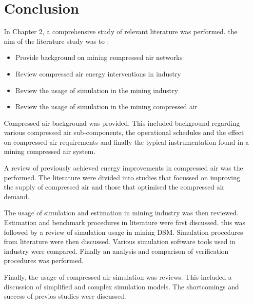 \section{Conclusion}
In Chapter 2, a comprehensive study of relevant literature was performed. the aim of the literature study was to :
\begin{itemize}
	\item Provide background on mining compressed air networks
	\item Review compressed air energy interventions in industry
	\item Review the usage of simulation in the mining industry 
	\item Review the usage of simulation in the mining compressed air
\end{itemize}
Compressed air background was provided. This included background regarding various compressed air sub-components, the operational schedules and the effect on compressed air requirements and finally the typical instrumentation found in a mining compressed air system.
\par
A review of previously achieved energy improvements in compressed air was the performed. The literature were divided into studies that focussed on improving the supply of compressed air and those that optimised the compressed air demand.
\par
The usage of simulation and estimation in mining industry was then reviewed. Estimation and benchmark procedures in literature were first discussed. this was followed by a review of simulation usage in mining DSM. Simulation procedures from literature were then discussed. Various simulation software tools used in industry were compared. Finally an analysis and comparison of verification procedures was performed.
\par 
	Finally, the usage of compressed air simulation was reviews. This included a discussion of simplified and complex simulation models. The shortcomings and success of previos studies were discussed.